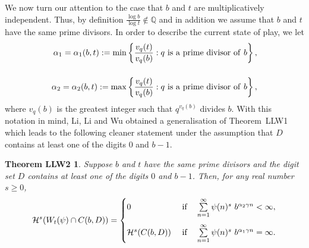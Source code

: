 \documentclass[12pt]{article}
\newtheorem*{llw2thm}{Theorem LLW2}
\theoremstyle{definition}
\theoremstyle{remark}
\newtheorem{remark}{{Remark}}[section]
\begin{document}
We now  turn our attention to  the case that $b$ and $t$ are multiplicatively independent.  Thus,  by definition $\frac{\log b}{\log t}\notin\mathbb{Q}$ and  in addition we assume that $b$ and $t$ have the same prime divisors.  In order to describe the current state of play, we let
\begin{equation}\label{18}
\begin{aligned}
\alpha_{1}= \alpha_{1}(b,t):=\min\left\{\frac{v_{q}(t)}{v_{q}(b)}:q\ {\rm is\ a\ prime\ divisor\ of}\ b\right\},  \\[3ex]
\alpha_{2}=\alpha_{2}(b,t):=\max\left\{\frac{v_{q}(t)}{v_{q}(b)}:q\ {\rm is\ a\ prime\ divisor\ of}\ b\right\},
\end{aligned}
\end{equation}
where $v_{q}(b)$ is the greatest integer such that $q^{v_{q}(b)}$ divides $b$.
With this notation in mind,  Li, Li and Wu \cite[Theorem 1.6]{LLW2025}  obtained a generalisation of Theorem~LLW1 which leads to the following cleaner statement under the assumption  that  $D$ contains at least one of the digits  $0$ and $b-1$.


\begin{llw2thm}
Suppose $b$ and $t$ have the same prime divisors  and the digit set  $D$ contains at least one of the digits $0$ and $b-1$.  Then, for any real number $s\geq0 $,
\begin{equation}  \label{eqn-thmllw}
\begin{aligned}
\mathcal{H}^{s}(W_{t}(\psi)\cap C(b,D))=\begin{cases} 0  \ &{\rm if}\quad  \sum\limits_{n=1}^{\infty} \psi(n)^{s} \ b^{\alpha_{2}\gamma n}<\infty, \\[3ex]
\mathcal{H}^{s}(C(b,D))  \ &{\rm if}\quad    \sum\limits_{n=1}^{\infty}\psi(n)^{s} \ b^{\alpha_{1}\gamma n}=\infty. \end{cases}
\end{aligned}
\end{equation}
\end{llw2thm}

%
%
\end{document}
